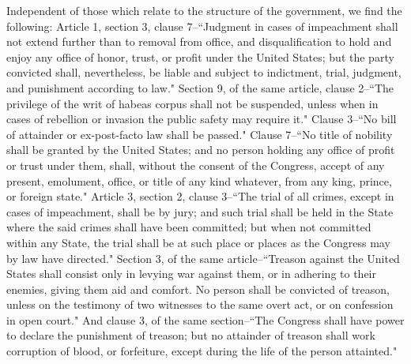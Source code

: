 Independent of those which relate to the structure of the government, we find the following: Article 1, section 3, clause 7--``Judgment in cases of impeachment shall not extend further than to removal from office, and disqualification to hold and enjoy any office of honor, trust, or profit under the United States; but the party convicted shall, nevertheless, be liable and subject to indictment, trial, judgment, and punishment according to law." Section 9, of the same article, clause 2--``The privilege of the writ of habeas corpus shall not be suspended, unless when in cases of rebellion or invasion the public safety may require it." Clause 3--``No bill of attainder or ex-post-facto law shall be passed." Clause 7--``No title of nobility shall be granted by the United States; and no person holding any office of profit or trust under them, shall, without the consent of the Congress, accept of any present, emolument, office, or title of any kind whatever, from any king, prince, or foreign state." Article 3, section 2, clause 3--``The trial of all crimes, except in cases of impeachment, shall be by jury; and such trial shall be held in the State where the said crimes shall have been committed; but when not committed within any State, the trial shall be at such place or places as the Congress may by law have directed." Section 3, of the same article--``Treason against the United States shall consist only in levying war against them, or in adhering to their enemies, giving them aid and comfort. 
No person shall be convicted of treason, unless on the testimony of two witnesses to the same overt act, or on confession in open court." And clause 3, of the same section--``The Congress shall have power to declare the punishment of treason; but no attainder of treason shall work corruption of blood, or forfeiture, except during the life of the person attainted."

